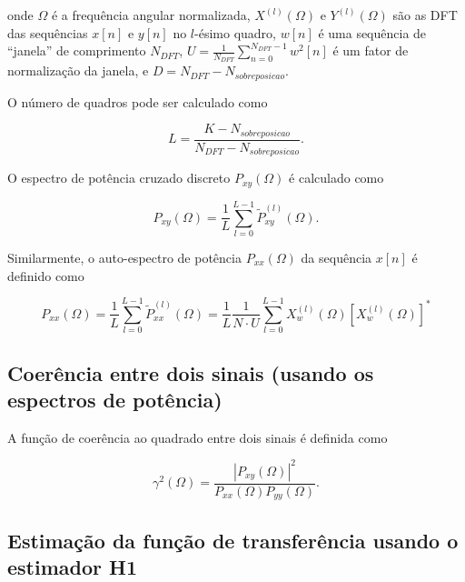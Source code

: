 \documentclass[a4paper,twoside,12pt]{article}
\begin{document}
	\noindent onde $\Omega$ é a frequência angular normalizada, $X^{(l)}(\Omega )$ e $Y^{(l)}(\Omega )$ são as DFT das sequências $x[n]$ e $y[n]$ no $l$-ésimo quadro, $w[n]$ é uma sequência de ``janela'' de comprimento $N_{DFT}$, $U = \frac{1}{N_{DFT}} \sum_{n=0}^{N_{DFT}-1} w^2[n]$ é um fator de normalização da janela, e $D = N_{DFT} - N_{sobreposicao}$.
	
	O número de quadros pode ser calculado como
	
	\begin{equation}
		L = \frac{K-N_{sobreposicao}}{N_{DFT}-N_{sobreposicao}}.
	\end{equation}
	
	O espectro de potência cruzado discreto $P_{xy}(\Omega)$ é calculado como
	
	\begin{equation}
		P_{xy}(\Omega) = \frac{1}{L} \sum_{l=0}^{L-1} \widetilde{P}_{xy}^{(l)}(\Omega).
	\end{equation}
	
	Similarmente, o auto-espectro de potência $P_{xx}(\Omega)$ da sequência $x[n]$ é definido como
	
	\begin{equation}
		P_{xx}(\Omega) = \frac{1}{L} \sum_{l=0}^{L-1} \widetilde{P}_{xx}^{(l)}(\Omega) = \frac{1}{L} \frac{1}{N \cdot U}  \sum_{l=0}^{L-1} X_w^{(l)}(\Omega ) \left[ X_w^{(l)}(\Omega ) \right]^*
	\end{equation}
	
	\subsection{Coerência entre dois sinais (usando os espectros de potência)}
	
	A função de coerência ao quadrado entre dois sinais é definida como
	
	\begin{equation}
		\gamma^2 (\Omega) = \frac{|P_{xy} (\Omega)|^2}{P_{xx}(\Omega) P_{yy}(\Omega)}.
	\end{equation}
	
	\subsection{Estimação da função de transferência usando o estimador H1}
	
\end{document}
